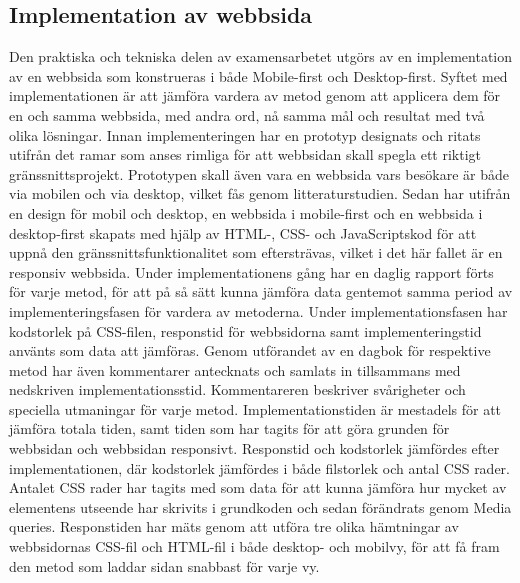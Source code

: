 \documentclass[11pt]{article}
\begin{document}
\subsection{Implementation av webbsida}
Den praktiska och tekniska delen av examensarbetet utgörs av en implementation av en webbsida som konstrueras i både Mobile-first och Desktop-first. Syftet med implementationen är att jämföra vardera av metod genom att applicera dem för en och samma webbsida, med andra ord, nå samma mål och resultat med två olika lösningar. Innan implementeringen har en prototyp designats och ritats utifrån det ramar som anses rimliga för att webbsidan skall spegla ett riktigt gränssnittsprojekt. Prototypen skall även vara en webbsida vars besökare är både via mobilen och via desktop, vilket fås genom litteraturstudien. Sedan har utifrån en design för mobil och desktop, en webbsida i mobile-first och en webbsida i desktop-first skapats med hjälp av HTML-, CSS- och JavaScriptskod för att uppnå den gränssnittsfunktionalitet som eftersträvas, vilket i det här fallet är en responsiv webbsida. Under implementationens gång har en daglig rapport förts för varje metod, för att på så sätt kunna jämföra data gentemot samma period av implementeringsfasen för vardera av metoderna. Under implementationsfasen har kodstorlek på CSS-filen, responstid för webbsidorna samt implementeringstid använts som data att jämföras. Genom utförandet av en dagbok för respektive metod har även kommentarer antecknats och samlats in tillsammans med nedskriven implementationsstid. Kommentareren beskriver svårigheter och speciella utmaningar för varje metod. Implementationstiden är mestadels för att jämföra totala tiden, samt tiden som har tagits för att göra grunden för webbsidan och webbsidan responsivt. Responstid och kodstorlek jämfördes efter implementationen, där kodstorlek jämfördes i både filstorlek och antal CSS rader. Antalet CSS rader har tagits med som data för att kunna jämföra hur mycket av elementens utseende har skrivits i grundkoden och sedan förändrats genom Media queries. Responstiden har mäts genom att utföra tre olika hämtningar av webbsidornas CSS-fil och HTML-fil i både desktop- och mobilvy, för att få fram den metod som laddar sidan snabbast för varje vy.
  
\end{document}
